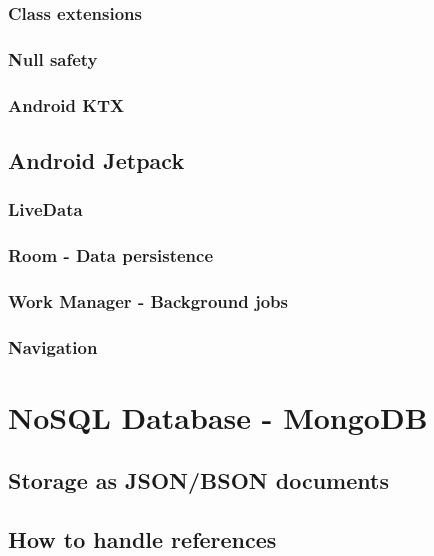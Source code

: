 \documentclass[11pt,a4paper]{report}
\begin{document}
\subsection{Class extensions}
\subsection{Null safety}

\subsection{Android KTX}
\section{Android Jetpack}
\subsection{LiveData}
\subsection{Room - Data persistence}
\subsection{Work Manager - Background jobs}
\subsection{Navigation}

\chapter{NoSQL Database - MongoDB}
\section{Storage as JSON/BSON documents}
\section{How to handle references}
\end{document}
